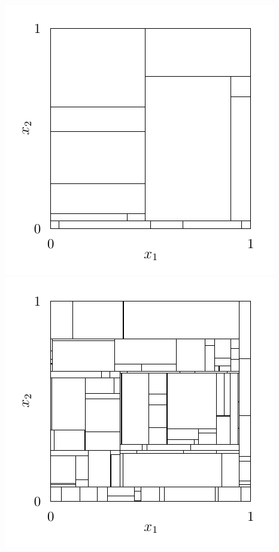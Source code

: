 \documentclass{article}
\begin{document}
\includegraphics[scale=0.5]{graphics/plot_mondrian_process_1.pdf}
\includegraphics[scale=0.5]{graphics/plot_mondrian_process_2.pdf}
\end{document}
